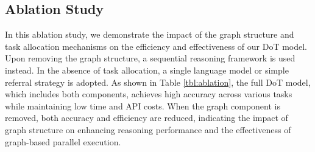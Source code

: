 \vspace{-4mm}

\subsection{Ablation Study}
\label{exp:ablation}




In this ablation study, we demonstrate the impact of the graph structure and task allocation mechanisms on the efficiency and effectiveness of our DoT model. Upon removing the graph structure, a sequential reasoning framework is used instead. In the absence of task allocation, a single language model or simple referral strategy is adopted. As shown in Table \ref{tbl:ablation}, the full DoT model, which includes both components, achieves high accuracy across various tasks while maintaining low time and API costs. When the graph component is removed, both accuracy and efficiency are reduced, indicating the impact of graph structure on enhancing reasoning performance and the effectiveness of graph-based parallel execution.

